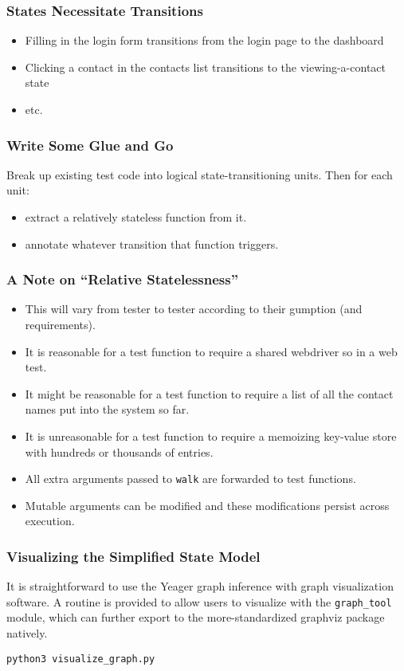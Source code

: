 \begin{frame}
  \frametitle{States Necessitate Transitions}
  \begin{itemize}
    \item Filling in the login form transitions from the login page to the dashboard
    \item Clicking a contact in the contacts list transitions to the viewing-a-contact state
    \item etc.
  \end{itemize}
\end{frame}

\begin{frame}
  \frametitle{Write Some Glue and Go}
  Break up existing test code into logical state-transitioning units. Then for each unit:
  \begin{itemize}
    \item extract a relatively stateless function from it.
    \item annotate whatever transition that function triggers.
  \end{itemize}
\end{frame}

\begin{frame}
  \frametitle{A Note on ``Relative Statelessness''}
  \begin{itemize}
    \item This will vary from tester to tester according to their gumption (and requirements).
    \item It is reasonable for a test function to require a shared webdriver so in a web test.
    \item It might be reasonable for a test function to require a list of all the contact names put into the system so far.
    \item It is unreasonable for a test function to require a memoizing key-value store with hundreds or thousands of entries.
    \item All extra arguments passed to \texttt{walk} are forwarded to test functions.
    \item Mutable arguments can be modified and these modifications persist across execution.
\end{itemize}

\end{frame}

\begin{frame}
  \frametitle{Visualizing the Simplified State Model}
  It is straightforward to use the Yeager graph inference with graph visualization software. A routine is provided to allow users to visualize with the \texttt{graph\_tool} module, which can further export to the more-standardized graphviz package natively.

  \texttt{python3 visualize\_graph.py} %
\end{frame}

